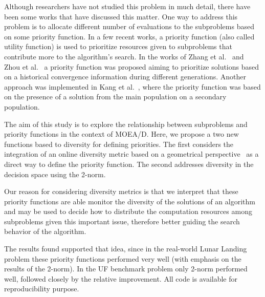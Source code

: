 Although researchers have not studied this problem in much detail, there have been some works that have discussed this matter. One way to address this problem is to allocate different number of evaluations to the subproblems based on some priority function. In a few recent works, a priority function (also called utility function) is used to prioritize resources given to subproblems that contribute more to the algorithm's search.  In the works of Zhang et al.~\cite{zhang2009performance} and Zhou et al.~\cite{zhou2016all} a priority function was proposed aiming to prioritize solutions based on a historical convergence information during different generations. Another approach was implemented in Kang et al.~\cite{kang2018collaborative}, where the priority function was based on the presence of a solution from the main population on a secondary population.

The aim of this study is to explore the relationship between subproblems and priority functions in the context of MOEA/D. Here, we propose a two new functions based to diversity for defining priorities. The first considers the integration of an online diversity metric based on a geometrical perspective~\cite{gee2015online} as a direct way to define the priority function. The second addresses diversity in the decision space using the 2-norm. 

Our reason for considering diversity metrics is that we interpret that these priority functions are able monitor the diversity of the solutions of an algorithm and may be used to decide how to distribute the computation resources among subproblems given this important issue, therefore better guiding the search behavior of the algorithm. 

The results found supported that idea, since in the real-world Lunar Landing problem these priority functions performed very well (with emphasis on the results of the 2-norm). In the UF benchmark problem only 2-norm performed well, followed closely by the relative improvement. All code is available for reproducibility purpose.
